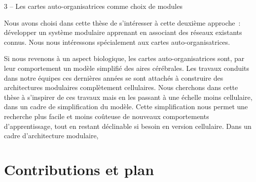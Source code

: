 3 – Les cartes auto-organisatrices comme choix de modules

Nous avons choisi dans cette thèse de s'intéresser à cette deuxième approche~: développer un système modulaire apprenant en associant des réseaux existants connus. Nous nous intéressons spécialement aux cartes auto-organisatrices.

Si nous revenons à un aspect biologique, les cartes auto-organisatrices sont, par leur comportement un modèle simplifié des aires cérébrales. Les travaux conduits dans notre équipes ces dernières années se sont attachés à construire des architectures modulaires complètement cellulaires. Nous cherchons dans cette thèse à s'inspirer de ces travaux mais en les passant à une échelle moins cellulaire, dans un cadre de simplification du modèle. Cette simplification nous permet une recherche plus facile et moins coûteuse de nouveaux comportements d'apprentissage, tout en restant déclinable si besoin en version cellulaire.
Dans un cadre d'architecture modulaire, 


\section{Contributions et plan}


